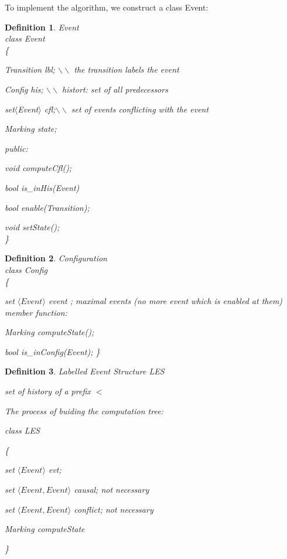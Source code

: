 \documentclass[11pt]{article}
\newtheorem{definition}{Definition}
\begin{document}
	To implement the algorithm, we construct a class Event:
	
	\begin{definition}{Event\\}
		class Event\\
		\{ 
		
		Transition lbl; 	$\backslash\backslash$ the transition labels the event
		
		Config his; 	$\backslash\backslash$ histort: set of all predecessors
		
		set$\langle$Event$\rangle$ cfl;$\backslash\backslash$ set of events conflicting with the event
		
		Marking state;
		
		\textup{public:}
		
		void computeCfl();
		
		bool is\_inHis(Event)
		
		bool enable(Transition);
		
		void setState();\\	
		\}
	\end{definition}
		
\begin{definition}{Configuration} \\
	class Config\\
	\{
	
		set $\langle Event \rangle$  event ; maximal events (no more event which is enabled at them) \\
		\textup{member function:}
		
		Marking computeState();
		
		bool is\_inConfig(Event);
	\}
\end{definition}

\begin{definition}{Labelled Event Structure LES}

	set of history of a prefix $<$
	
	The process of buiding the computation tree:
	
	class LES
	
	\{
	
		set $\langle Event \rangle$ evt;
		
		set $\langle Event,Event \rangle$ causal; not necessary
		
		set $\langle Event,Event \rangle$ conflict; not necessary
	
		Marking computeState
		
	\}
\end{definition}
\end{document}
